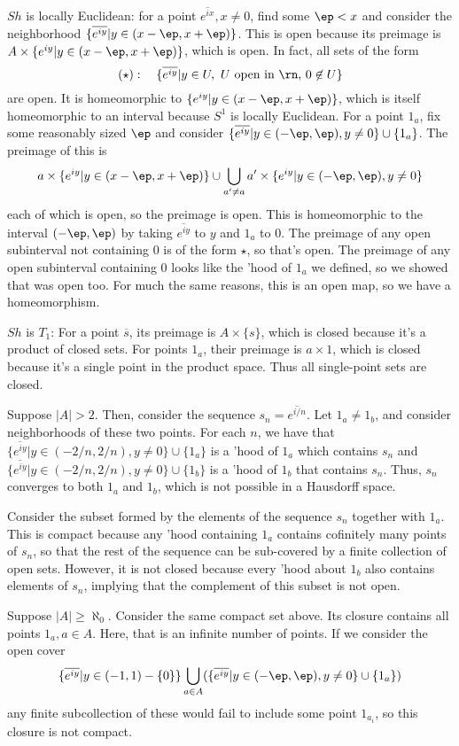 \documentclass{article}
\let\bar\overline
\begin{document}
$Sh$ is locally Euclidean: for a point $\bar{e^{ix}},x\neq0$, find some $\ep<x$ and consider the neighborhood $\{\bar{e^{iy}}|y\in(x-\ep,x+\ep)\}$. This is open because its preimage is $A\times\{e^{iy}|y\in(x-\ep,x+\ep)\}$, which is open. In fact, all sets of the form 
$$(\star):\quad\{\bar{e^{iy}}|y\in U,\text{ $U$ open in $\rn$, $0\not\in U$}\}$$ 
are open. It is homeomorphic to $\{e^{iy}|y\in(x-\ep,x+\ep)\}$, which is itself homeomorphic to an interval because $S^1$ is locally Euclidean. For a point $1_a$, fix some reasonably sized $\ep$ and consider $\{\bar{e^{iy}}|y\in(-\ep,\ep),y\neq0\}\cup\{1_a\}$. The preimage of this is 
$$a\times\{e^{iy}|y\in(x-\ep,x+\ep)\}\cup\bigcup_{a'\neq a}a'\times\{e^{iy}|y\in(-\ep,\ep),y\neq0\}$$
each of which is open, so the preimage is open. This is homeomorphic to the interval $(-\ep,\ep)$ by taking $\bar{e^{iy}}$ to $y$ and $1_a$ to $0$. The preimage of any open subinterval not containing $0$ is of the form $\star$, so that's open. The preimage of any open subinterval containing $0$ looks like the 'hood of $1_a$ we defined, so we showed that was open too. For much the same reasons, this is an open map, so we have a homeomorphism.

$Sh$ is $T_1$: For a point $\bar{s}$, its preimage is $A\times\{s\}$, which is closed because it's a product of closed sets. For points $1_a$, their preimage is $a\times 1$, which is closed because it's a single point in the product space. Thus all single-point sets are closed.

Suppose $|A|>2$. Then, consider the sequence $s_n=\bar{e^{i/n}}$. Let $1_a\neq1_b$, and consider neighborhoods of these two points. For each $n$, we have that $\{\bar{e^{iy}}|y\in(-2/n,2/n),y\neq0\}\cup\{1_a\}$ is a 'hood of $1_a$ which contains $s_n$ and $\{\bar{e^{iy}}|y\in(-2/n,2/n),y\neq0\}\cup\{1_b\}$ is a 'hood of $1_b$ that contains $s_n$. Thus, $s_n$ converges to both $1_a$ and $1_b$, which is not possible in a Hausdorff space.

Consider the subset formed by the elements of the sequence $s_n$ together with $1_a$. This is compact because any 'hood containing $1_a$ contains cofinitely many points of $s_n$, so that the rest of the sequence can be sub-covered by a finite collection of open sets. However, it is not closed because every 'hood about $1_b$ also contains elements of $s_n$, implying that the complement of this subset is not open.

Suppose $|A|\geq\aleph_0$. Consider the same compact set above. Its closure contains all points $1_a,a\in A$. Here, that is an infinite number of points. If we consider the open cover 
$$\{\bar{e^{iy}}|y\in(-1,1)-\{0\}\}\bigcup_{a\in A}(\{\bar{e^{iy}}|y\in(-\ep,\ep),y\neq0\}\cup\{1_a\})$$
any finite subcollection of these would fail to include some point $1_{a_i}$, so this closure is not compact.
\end{document}
